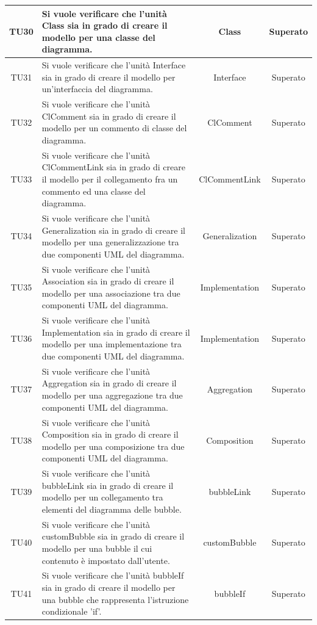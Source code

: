\documentclass[../PianoDiQualifica.tex]{subfiles}
\begin{document}
\begin{longtable}{|c|>{\centering}p{8cm}|c|c|}
		\hline
		\hypertarget{TU30}{TU30}&Si vuole verificare che l'unità Class sia in grado di creare il modello per una classe del diagramma. & Class&Superato\\
		\hline
		\hypertarget{TU31}{TU31}&Si vuole verificare che l'unità Interface sia in grado di creare il modello per un'interfaccia del diagramma. & Interface &Superato\\
		\hline
		\hypertarget{TU32}{TU32}&Si vuole verificare che l'unità ClComment sia in grado di creare il modello per un commento di classe del diagramma. &ClComment  &Superato\\
		\hline
		\hypertarget{TU33}{TU33}& Si vuole verificare che l'unità ClCommentLink sia in grado di creare il modello per il collegamento fra un commento ed una classe del diagramma. &ClCommentLink &Superato\\
		\hline
		\hypertarget{TU34}{TU34}&Si vuole verificare che l'unità Generalization sia in grado di creare il modello per una generalizzazione tra due componenti UML del diagramma. &Generalization &Superato\\
		\hline
		\hypertarget{TU35}{TU35}& Si vuole verificare che l'unità Association sia in grado di creare il modello per una associazione tra due componenti UML del diagramma.&Implementation &Superato\\
		\hline
		\hypertarget{TU36}{TU36}&Si vuole verificare che l'unità Implementation sia in grado di creare il modello per una implementazione tra due componenti UML del diagramma. &Implementation &Superato\\
		\hline
		\hypertarget{TU37}{TU37}&Si vuole verificare che l'unità Aggregation sia in grado di creare il modello per una aggregazione tra due componenti UML del diagramma. &Aggregation  &Superato\\
		\hline
		\hypertarget{TU38}{TU38}&Si vuole verificare che l'unità Composition sia in grado di creare il modello per una composizione tra due componenti UML del diagramma. &Composition &Superato\\
		\hline
		\hypertarget{TU39}{TU39}& Si vuole verificare che l'unità bubbleLink sia in grado di creare il modello per un collegamento tra elementi del diagramma delle bubble.&bubbleLink &Superato\\
		\hline
		\hypertarget{TU40}{TU40}&Si vuole verificare che l'unità customBubble sia in grado di creare il modello per una bubble il cui contenuto è impostato dall'utente.& customBubble &Superato\\
		\hline
		\hypertarget{TU41}{TU41}& Si vuole verificare che l'unità bubbleIf sia in grado di creare il modello per una bubble che rappresenta l'istruzione condizionale 'if'. & bubbleIf&Superato\\

\end{longtable}
\end{document}
